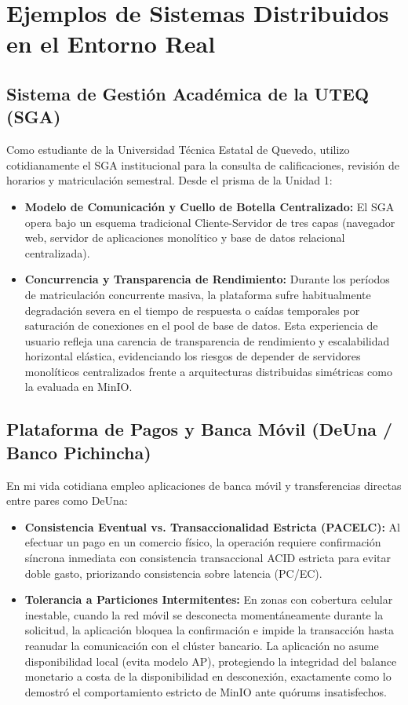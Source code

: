 \documentclass[12pt,a4paper]{article}
\begin{document}
\section{Ejemplos de Sistemas Distribuidos en el Entorno Real}

\subsection{Sistema de Gestión Académica de la UTEQ (SGA)}
Como estudiante de la Universidad Técnica Estatal de Quevedo, utilizo cotidianamente el SGA institucional para la consulta de calificaciones, revisión de horarios y matriculación semestral. Desde el prisma de la Unidad 1:
\begin{itemize}[leftmargin=*]
    \item \textbf{Modelo de Comunicación y Cuello de Botella Centralizado:} El SGA opera bajo un esquema tradicional Cliente-Servidor de tres capas (navegador web, servidor de aplicaciones monolítico y base de datos relacional centralizada). 
    \item \textbf{Concurrencia y Transparencia de Rendimiento:} Durante los períodos de matriculación concurrente masiva, la plataforma sufre habitualmente degradación severa en el tiempo de respuesta o caídas temporales por saturación de conexiones en el pool de base de datos. Esta experiencia de usuario refleja una carencia de transparencia de rendimiento y escalabilidad horizontal elástica, evidenciando los riesgos de depender de servidores monolíticos centralizados frente a arquitecturas distribuidas simétricas como la evaluada en MinIO.
\end{itemize}

\subsection{Plataforma de Pagos y Banca Móvil (DeUna / Banco Pichincha)}
En mi vida cotidiana empleo aplicaciones de banca móvil y transferencias directas entre pares como DeUna:
\begin{itemize}[leftmargin=*]
    \item \textbf{Consistencia Eventual vs. Transaccionalidad Estricta (PACELC):} Al efectuar un pago en un comercio físico, la operación requiere confirmación síncrona inmediata con consistencia transaccional ACID estricta para evitar doble gasto, priorizando consistencia sobre latencia (PC/EC).
    \item \textbf{Tolerancia a Particiones Intermitentes:} En zonas con cobertura celular inestable, cuando la red móvil se desconecta momentáneamente durante la solicitud, la aplicación bloquea la confirmación e impide la transacción hasta reanudar la comunicación con el clúster bancario. La aplicación no asume disponibilidad local (evita modelo AP), protegiendo la integridad del balance monetario a costa de la disponibilidad en desconexión, exactamente como lo demostró el comportamiento estricto de MinIO ante quórums insatisfechos.
\end{itemize}
\end{document}
